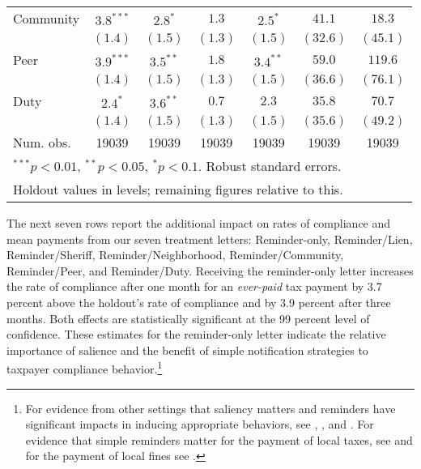 \documentclass[12pt]{article}
\begin{document}
\begin{table}[htbp]
\begin{center}
\begin{tabular}{l c c c c c c }
Community    & $3.8^{***}$  & $2.8^{*}$    & $1.3$        & $2.5^{*}$    & $41.1$        & $18.3$        \\
             & $(1.4)$      & $(1.5)$      & $(1.3)$      & $(1.5)$      & $(32.6)$      & $(45.1)$      \\
Peer         & $3.9^{***}$  & $3.5^{**}$   & $1.8$        & $3.4^{**}$   & $59.0$        & $119.6$       \\
             & $(1.4)$      & $(1.5)$      & $(1.3)$      & $(1.5)$      & $(36.6)$      & $(76.1)$      \\
Duty         & $2.4^{*}$    & $3.6^{**}$   & $0.7$        & $2.3$        & $35.8$        & $70.7$        \\
             & $(1.4)$      & $(1.5)$      & $(1.3)$      & $(1.5)$      & $(35.6)$      & $(49.2)$      \\
\hline
Num. obs.    & 19039        & 19039        & 19039        & 19039        & 19039         & 19039         \\
\hline
\multicolumn{7}{l}{\scriptsize{$^{***}p<0.01$, $^{**}p<0.05$, $^*p<0.1$. Robust standard errors.}} \\
\multicolumn{7}{l}{\scriptsize{Holdout values in levels; remaining figures relative to this.}}
\end{tabular}
\end{center}
\end{table}

The next seven rows report the additional impact on rates of
compliance and mean payments from our seven treatment letters: Reminder-only,
Reminder/Lien, Reminder/Sheriff, Reminder/Neighborhood,
Reminder/Community, Reminder/Peer, and Reminder/Duty.  Receiving the
reminder-only letter increases the rate of compliance after one month
for an \textit{ever-paid} tax payment by 3.7 percent above the
holdout's rate of compliance and by 3.9 percent after three months.
Both effects are statistically significant at the 99 percent level of
confidence.  These estimates for the reminder-only letter indicate the
relative importance of salience and the benefit of simple notification
strategies to taxpayer compliance behavior.\footnote{For evidence from
  other settings that saliency matters and reminders have significant
  impacts in inducing appropriate behaviors, see
  , , and
  . For evidence that simple reminders matter
  for the payment of local taxes, see  and for the
  payment of local fines see .}
\end{document}

